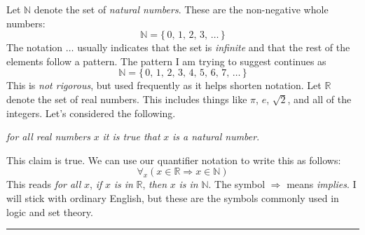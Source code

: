             \begin{example}
                Let $\mathbb{N}$ denote the set of \textit{natural numbers}.
                These are the non-negative whole numbers:
                \begin{equation}
                    \mathbb{N}=\{\,0,\,1,\,2,\,3,\,\dots\,\}
                \end{equation}
                The notation $\dots$ usually indicates that the set is
                \textit{infinite} and that the rest of the elements follow a
                pattern. The pattern I am trying to suggest continues as
                \begin{equation}
                    \mathbb{N}=\{\,0,\,1,\,2,\,3,\,4,\,5,\,6,\,7,\,\dots\,\}
                \end{equation}
                This is \textit{not rigorous}, but used frequently as it helps
                shorten notation. Let $\mathbb{R}$ denote the set of real
                numbers. This includes things like $\pi$, $e$, $\sqrt{2}$, and
                all of the integers. Let's considered the following.
                \begin{center}
                    \textit{for all real numbers} $x$
                    \textit{it is true that} $x$ \textit{is a natural number}.
                \end{center}
                This claim is true. We can use our quantifier notation to write
                this as follows:
                \begin{equation}
                    \forall_{x}(x\in\mathbb{R}\Rightarrow{x}\in\mathbb{N})
                \end{equation}
                This reads \textit{for all} $x$, \textit{if} $x$
                \textit{is in} $\mathbb{R}$, \textit{then} $x$
                \textit{is in} $\mathbb{N}$. The symbol $\Rightarrow$ means
                \textit{implies}. I will stick with ordinary English, but these
                are the symbols commonly used in logic and set theory.
            \end{example}
            \hrule
